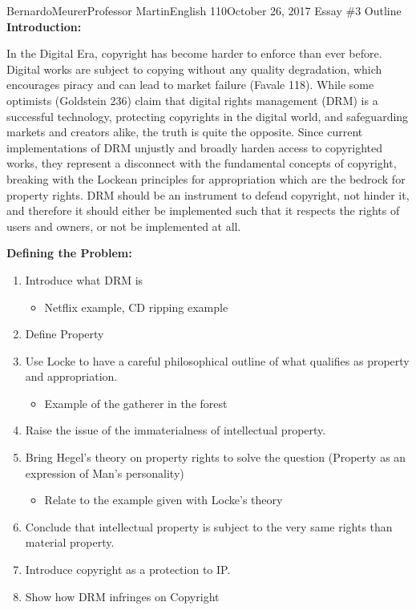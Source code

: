 \documentclass[12pt,letterpaper]{article}
\begin{document}
        \begin{mla}{Bernardo}{Meurer}{Professor Martin}{English 110}{October 26, 2017}%
            {Essay \#3 Outline}
        \noindent \textbf{Introduction:}

        In the Digital Era, copyright has become harder to enforce than ever before. Digital works are subject to copying without any quality degradation, which encourages piracy and can lead to market failure (Favale 118). While some optimists (Goldstein 236) claim that digital rights management (DRM) is a successful technology, protecting copyrights in the digital world, and safeguarding markets and creators alike, the truth is quite the opposite. Since current implementations of DRM unjustly and broadly harden access to copyrighted works, they represent a disconnect with the fundamental concepts of copyright, breaking with the Lockean principles for appropriation which are the bedrock for property rights. DRM should be an instrument to defend copyright, not hinder it, and therefore it should either be implemented such that it respects the rights of users and owners, or not be 
        implemented at all.

        \noindent \textbf{Defining the Problem:}

        \begin{enumerate}
            \item Introduce what DRM is
            \begin{itemize}
                \item Netflix example, CD ripping example
            \end{itemize}
            \item Define Property
            \item Use Locke to have a careful philosophical outline of what qualifies as property and appropriation.
            \begin{itemize}
                \item Example of the gatherer in the forest
            \end{itemize}
            \item Raise the issue of the immaterialness of intellectual property.
            \item Bring Hegel's theory on property rights to solve the question (Property as an expression of Man's personality)
            \begin{itemize}
                \item Relate to the example given with Locke's theory
            \end{itemize}
            \item Conclude that intellectual property is subject to the very same rights than material property.
            \item Introduce copyright as a protection to IP.
            \item Show how DRM infringes on Copyright
        \end{enumerate}
        

\end{mla}
\end{document}
